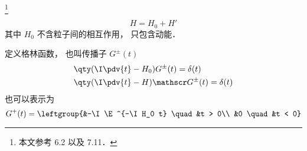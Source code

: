 
\footnote{本文参考 \cite{Newton} 6.2 以及 \cite{Sakurai} 7.11．}

\begin{equation}
H = H_0 + H'
\end{equation}
其中 $H_0$ 不含粒子间的相互作用， 只包含动能．

定义格林函数， 也叫传播子 $G^\pm(t)$
\begin{equation}
\begin{aligned}
&\qty(\I\pdv{t} - H_0)G^\pm (t) = \delta(t)\\
&\qty(\I\pdv{t} - H)\mathscr G^\pm (t) = \delta(t)
\end{aligned}
\end{equation}
也可以表示为
\begin{equation}
G^+(t) = \leftgroup{&-\I \E^{-\I H_0 t} \quad &t > 0\\
&0 \quad &t < 0}
\end{equation}
